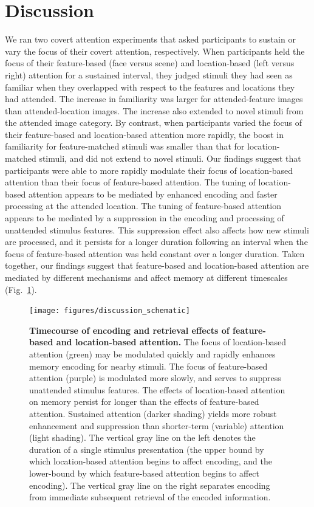 \documentclass[english]{article}
\begin{document}
\section*{Discussion}

We ran two covert attention experiments that asked participants to sustain or
vary the focus of their covert attention, respectively. When participants held
the focus of their feature-based (face versus scene) and location-based (left
versus right) attention for a sustained interval, they judged stimuli they had
seen as familiar when they overlapped with respect to the features and
locations they had attended. The increase in familiarity was larger for
attended-feature images than attended-location images. The increase also
extended to novel stimuli from the attended image category. By contrast, when
participants varied the focus of their feature-based and location-based
attention more rapidly, the boost in familiarity for feature-matched stimuli
was smaller than that for location-matched stimuli, and did not extend to novel
stimuli. Our findings suggest that participants were able to more rapidly
modulate their focus of location-based attention than their focus of
feature-based attention. The tuning of location-based attention appears to be
mediated by enhanced encoding and faster processing at the attended location.
The tuning of feature-based attention appears to be mediated by a suppression
in the encoding and processing of unattended stimulus features. This
suppression effect also affects how new stimuli are processed, and it persists
for a longer duration following an interval when the focus of feature-based
attention was held constant over a longer duration. Taken together, our
findings suggest that feature-based and location-based attention are mediated
by different mechanisms and affect memory at different timescales
(Fig.~\ref{fig:model}).

\begin{figure}[tp]
  \centering \texttt{[image: figures/discussion\_schematic]}

  \caption{\textbf{Timecourse of encoding and retrieval effects of
  feature-based and location-based attention.} The focus of location-based
  attention (green) may be modulated quickly and rapidly enhances memory
  encoding for nearby stimuli. The focus of feature-based attention (purple) is
  modulated more slowly, and serves to suppress unattended stimulus features.
  The effects of location-based attention on memory persist for longer than the
  effects of feature-based attention. Sustained attention (darker shading)
  yields more robust enhancement and suppression than shorter-term (variable)
  attention (light shading). The vertical gray line on the left denotes the
  duration of a single stimulus presentation (the upper bound by which
  location-based attention begins to affect encoding, and the lower-bound by
  which feature-based attention begins to affect encoding). The vertical gray
  line on the right separates encoding from immediate subsequent retrieval of
  the encoded information.}

\label{fig:model}
\end{figure}
\end{document}
